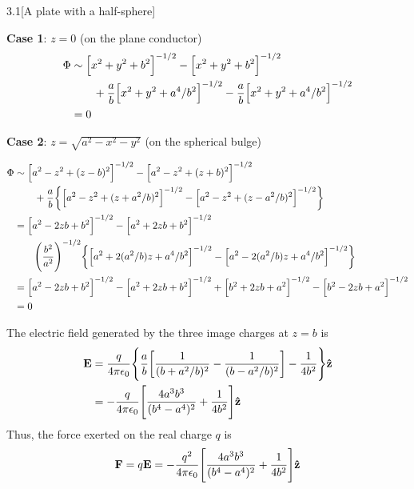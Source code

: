 \documentclass[12pt]{article}
\begin{document}
\begin{problem}{3.1}[A plate with a half-sphere]
\begin{solution}
\textbf{Case 1}: $z=0$ (on the plane conductor)
\begin{align}
    \Phi&\sim\qty[x^2+y^2+b^2]^{-1/2}-\qty[x^2+y^2+b^2]^{-1/2}\notag\\
        &\qquad+\frac{a}{b}\qty[x^2+y^2+a^4/b^2]^{-1/2}
        -\frac{a}{b}\qty[x^2+y^2+a^4/b^2]^{-1/2}\notag\\
        &=0
\end{align}

\textbf{Case 2}: $z=\sqrt{a^2-x^2-y^2}$ (on the spherical bulge)

\begin{align}
    \Phi&\sim\qty[a^2-z^2+(z-b)^2]^{-1/2}-\qty[a^2-z^2+(z+b)^2]^{-1/2}\notag\\
        &\qquad+\frac{a}{b}\qty{
            \qty[a^2-z^2+(z+a^2/b)^2]^{-1/2}-\qty[a^2-z^2+(z-a^2/b)^2]^{-1/2}
        }\notag\\
        &=\qty[a^2-2zb+b^2]^{-1/2}-\qty[a^2+2zb+b^2]^{-1/2}\notag\\
        &\qquad\qty(\frac{b^2}{a^2})^{-1/2}\qty{
            \qty[a^2+2(a^2/b)z+a^4/b^2]^{-1/2}
            -\qty[a^2-2(a^2/b)z+a^4/b^2]^{-1/2}
        }\notag\\
        &=\qty[a^2-2zb+b^2]^{-1/2}-\qty[a^2+2zb+b^2]^{-1/2}
        +\qty[b^2+2zb+a^2]^{-1/2}-\qty[b^2-2zb+a^2]^{-1/2}\notag\\
        &=0
\end{align}

The electric field generated by the three image charges at $z=b$ is
\begin{align}
    \vb{E}&=\frac{q}{4\pi\epsilon_0}\qty{\frac{a}{b}\qty[
        \frac1{(b+a^2/b)^2}
        -\frac1{(b-a^2/b)^2}
        ]
        -\frac1{4b^2}
    }\vb{\hat{z}}\notag\\
    &=-\frac{q}{4\pi\epsilon_0}\qty[\frac{4a^3b^3}{(b^4-a^4)^2}+\frac1{4b^2}]\vb{\hat{z}}
\end{align}
Thus, the force exerted on the real charge $q$ is
\begin{equation}
    \vb{F}=q\vb{E}=-\frac{q^2}{4\pi\epsilon_0}\qty[\frac{4a^3b^3}{(b^4-a^4)^2}+\frac1{4b^2}]\vb{\hat{z}}
\end{equation}


\end{solution}
\end{problem}
\end{document}

